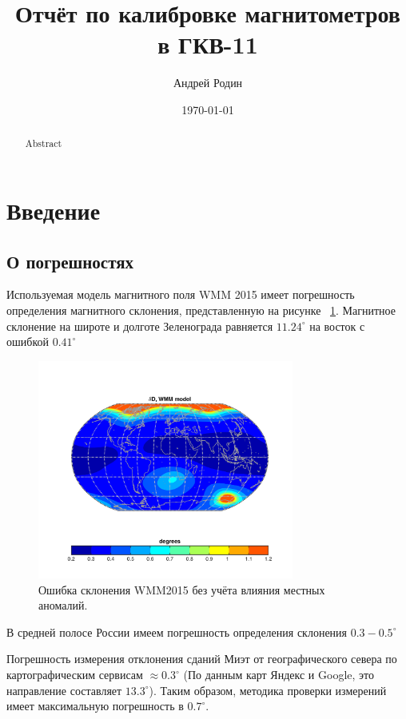 \documentclass[a4paper,12pt]{article}
\author{Андрей Родин} %
\title{Отчёт по калибровке магнитометров в ГКВ-11}  %
\date{\today} %
\begin{document}
\maketitle

\begin{abstract}
    Abstract
\end{abstract}

\section{Введение}
\subsection{О погрешностях}
Используемая модель магнитного поля WMM 2015 имеет погрешность определения магнитного склонения, представленную на рисунке ~\ref{fig:WMM_error_field}. Магнитное склонение на широте и долготе Зеленограда равняется $11.24^\circ$ на восток с ошибкой $0.41^\circ$

\begin{figure}[htb] %
\centering
\includegraphics[width=0.75\textwidth]{PICS/WMM2015_Error_Declination.png} %
\caption{\label{fig:WMM_error_field} Ошибка склонения WMM2015 без учёта влияния местных аномалий.} %
\end{figure}

В средней полосе России имеем погрешность определения склонения  $0.3-0.5^\circ$
\vspace{\baselineskip}

Погрешность измерения отклонения сданий Миэт от географического севера по картографическим сервисам  $\approx 0.3^\circ$ (По данным карт Яндекс и Google, это направление составляет $13.3^\circ$). Таким образом, методика проверки измерений имеет максимальную погрешность в $0.7^\circ$. 
\end{document}

